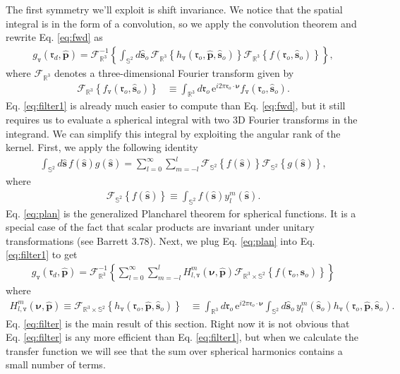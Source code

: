 \documentclass[11pt]{article}
\newcommand{\me}{\mathrm{e}}
\providecommand{\mc}[1]{\mathcal{#1}}
\providecommand{\ro}{\mathbf{\mathfrak{r}}_o}
\providecommand{\so}{\mathbf{\hat{s}}_o}
\providecommand{\rd}{\mathbf{\mathfrak{r}}_d}
\providecommand{\mh}[1]{\mathbf{\hat{#1}}}
\providecommand{\mbb}[1]{\mathbb{#1}}
\providecommand{\bs}[1]{\boldsymbol{#1}}
\providecommand{\tv}{\texttt{v}}
\providecommand{\bv}{\bs{\nu}}
\providecommand{\p}{\mh{p}}
\providecommand{\lmsum}{\sum_{l=0}^\infty\sum_{m=-l}^{l}}
\providecommand{\intr}[1]{\int_{\mbb{R}^{#1}}}
\providecommand{\ints}[1]{\int_{\mbb{S}^{#1}}}
\begin{document}
The first symmetry we'll exploit is shift invariance. We notice that the
spatial integral is in the form of a convolution, so we apply the
convolution theorem and rewrite Eq. \ref{eq:fwd} as
\begin{align}
  g_{\tv}(\rd, \p) = \mc{F}^{-1}_{\mbb{R}^3}\left\{\ints{2}d\so\, \mc{F}_{\mbb{R}^3}\left\{h_{\tv}(\ro, \mh{p}, \so)\right\} \mc{F}_{\mbb{R}^3}\left\{f(\ro, \so)\right\}\right\}, \label{eq:filter1}
\end{align}
where $\mc{F}_{\mbb{R}^3}$ denotes a three-dimensional Fourier transform given by
\begin{align}
  \mc{F}_{\mbb{R}^3}\left\{f_{\tv}(\ro, \so)\right\} &\equiv \intr{3}d\ro\, \me^{i2\pi\ro\cdot\bv} f_{\tv}(\ro, \so).
\end{align}
Eq. \ref{eq:filter1} is already much easier to compute than Eq. \ref{eq:fwd},
but it still requires us to evaluate a spherical integral with two 3D Fourier
transforms in the integrand. We can simplify this integral by exploiting the
angular rank of the kernel. First, we apply the following identity
\begin{align}
  \ints{2}d\mh{s}{}\, f(\mh{s})g(\mh{s}) = \lmsum \mc{F}_{\mbb{S}^2}\left\{f(\mh{s})\right\}\mc{F}_{\mbb{S}^2}\left\{g(\mh{s})\right\}, \label{eq:plan}
\end{align}
where
\begin{align}
  \mc{F}_{\mbb{S}^2}\left\{f(\mh{s})\right\} \equiv \int_{\mbb{S}^2}f(\mh{s})y_l^m(\mh{s}).
\end{align}
Eq. \ref{eq:plan} is the generalized Plancharel theorem for spherical functions.
It is a special case of the fact that scalar products are invariant under
unitary transformations (see Barrett 3.78). Next, we plug Eq. \ref{eq:plan}
into Eq. \ref{eq:filter1} to get
\begin{align}
  g_{\tv}(\rd, \p) = \mc{F}^{-1}_{\mbb{R}^3}\left\{\lmsum H_{l,\tv}^m(\bv, \mh{p}) \mc{F}_{\mbb{R}^3\times\mbb{S}^2}\left\{f(\ro, \so)\right\}\right\} \label{eq:filter}
\end{align}
where
\begin{align}
  H_{l,\tv}^m(\bv, \mh{p}) \equiv \mc{F}_{\mbb{R}^3\times\mbb{S}^2}\left\{h_{\tv}(\ro, \p, \so)\right\} &\equiv \intr{3}d\ro\, \me^{i2\pi\ro\cdot\bv}\ints{2}d\so\, y_l^m(\so) h_{\tv}(\ro, \p, \so).\label{eq:transfer}
\end{align}
Eq. \ref{eq:filter} is the main result of this section. Right now it is not
obvious that Eq. \ref{eq:filter} is any more efficient than Eq.
\ref{eq:filter1}, but when we calculate the transfer function we will see that
the sum over spherical harmonics contains a small number of terms.
\end{document}
